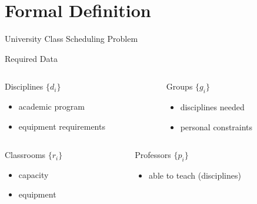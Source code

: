 \section{Formal Definition}

\begin{frame}{University Class Scheduling Problem}
  \centering
  \begin{block}{Required Data}
    \begin{columns}[t]
      \begin{column}{.4\textwidth}
        \begin{block}{Disciplines $\{d_i\}$}
          \begin{itemize}
            \item academic program
            \item equipment requirements
          \end{itemize}
        \end{block}
      \end{column}
      \begin{column}{.4\textwidth}
        \begin{block}{Groups $\{g_i\}$}
          \begin{itemize}
            \item disciplines needed
            \item personal constraints
          \end{itemize}
        \end{block}
      \end{column}
    \end{columns}
    \begin{columns}[t]
      \begin{column}{.4\textwidth}
        \begin{block}{Classrooms $\{r_i\}$}
          \begin{itemize}
            \item capacity
            \item equipment
          \end{itemize}
        \end{block}
      \end{column}
      \begin{column}{.4\textwidth}
        \begin{block}{Professors $\{p_i\}$}
          \begin{itemize}
            \item able to teach (disciplines)

\end{itemize}
\end{block}
\end{column}
\end{columns}
\end{block}
\end{frame}
